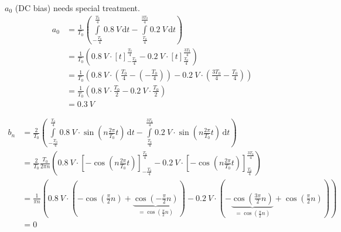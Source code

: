 \begin{solution}
\begin{tasks}
		$a_0$ (DC bias) needs special treatment.
		\begin{equation*}
			\begin{split}
				a_0 &= \frac{1}{T_0} \left( \int\limits_{-\frac{T_0}{4}}^{\frac{T_0}{4}} \SI{0.8}{V} \, \mathrm{d} t - \int\limits_{\frac{T_0}{4}}^{\frac{3T_0}{4}} \SI{0.2}{V}  \, \mathrm{d} t \right) \\
				 &= \frac{1}{T_0} \left( \SI{0.8}{V} \cdot \left[t\right]_{-\frac{T_0}{4}}^{\frac{T_0}{4}} - \SI{0.2}{V} \cdot \left[t\right]_{\frac{T_0}{4}}^{\frac{3T_0}{4}} \right) \\
				 &= \frac{1}{T_0} \left( \SI{0.8}{V} \cdot \left(\frac{T_0}{4} - \left(-\frac{T_0}{4}\right)\right) - \SI{0.2}{V} \cdot \left(\frac{3T_0}{4} - \frac{T_0}{4}\right) \right) \\
				 &= \frac{1}{T_0} \left( \SI{0.8}{V} \cdot \frac{T_0}{2} - \SI{0.2}{V} \cdot \frac{T_0}{2} \right) \\
				 &= \SI{0.3}{V}
			\end{split}
		\end{equation*}
		
		\begin{equation*}
			\begin{split}
				b_n &= \frac{2}{T_0} \left( \int\limits_{-\frac{T_0}{4}}^{\frac{T_0}{4}} \SI{0.8}{V} \cdot \sin\left(n\frac{2\pi}{T_0}t\right) \, \mathrm{d} t - \int\limits_{\frac{T_0}{4}}^{\frac{3T_0}{4}} \SI{0.2}{V} \cdot \sin\left(n\frac{2\pi}{T_0}t\right) \, \mathrm{d} t \right) \\
				 &= \frac{2}{T_0} \frac{T_0}{2 \pi n} \left( \SI{0.8}{V} \cdot \left[-\cos\left(n\frac{2\pi}{T_0}t\right)\right]_{-\frac{T_0}{4}}^{\frac{T_0}{4}} - \SI{0.2}{V} \cdot \left[-\cos\left(n\frac{2\pi}{T_0}t\right)\right]_{\frac{T_0}{4}}^{\frac{3T_0}{4}} \right) \\
				 &= \frac{1}{\pi n} \left(
					\SI{0.8}{V} \cdot \left(
						-\cos\left(\frac{\pi}{2}n\right)
						+ \underbrace{\cos\left(-\frac{\pi}{2}n\right)}_{= \cos\left(\frac{\pi}{2}n\right)}
					\right)
					- \SI{0.2}{V} \cdot \left(
						-\underbrace{\cos\left(\frac{3\pi}{2}n\right)}_{= \cos\left(\frac{\pi}{2}n\right)}
						+ \cos\left(\frac{\pi}{2}n\right)
					\right)
				\right) \\
				 &= 0
			\end{split}
		\end{equation*}
		

\end{tasks}
\end{solution}
